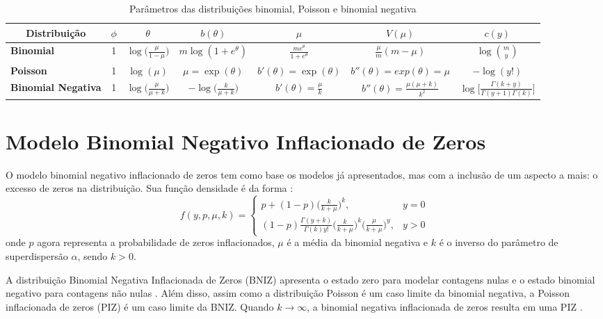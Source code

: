 \documentclass[12pt, a4paper, twoside]{report}
\numberwithin{equation}{section} %
\begin{document}
\begin{table}[h]
\centering
\footnotesize
\caption{Parâmetros das distribuições binomial, Poisson e binomial negativa}
\begin{tabular}{c|c|c|c|c|c|c} \hline
    \textbf{Distribuição} & $\phi$ & $\theta$ & $b(\theta)$ & $\mu$ & $V(\mu)$ & $c(y)$ \\ \hline
	\multicolumn{1}{l|}{\textbf{Binomial}} & 1 & $\log{ \biggl(\frac{\mu}{1-\mu} \biggl)}$ & $m \log(1+e^{\theta})$ & $\frac{me^{\theta}}{1+e^{\theta}}$ &  $\frac{\mu}{m}(m-\mu)$ & $\log{m \choose y}$ \\ \hline
	\multicolumn{1}{l|}{\textbf{Poisson}} & 1 & $\log{(\mu)}$ & $\mu=\exp(\theta)$ & $b'(\theta)=\exp(\theta)$ & $b''(\theta)=exp(\theta)=\mu$ & $-\log(y!)$ \\ \hline
    \multicolumn{1}{l|}{\textbf{Binomial Negativa}} & 1 & $\log\biggl(\frac{\mu}{\mu + k}\biggl)$ & $-\log\biggl(\frac{k}{\mu + k}\biggl)$ & $b'(\theta)=\frac{\mu}{k}$ & $b''(\theta)=\frac{\mu(\mu+k)}{k^2}$ & $\log\biggl[\frac{\Gamma(k+y)}{\Gamma(y+1)\Gamma(k)}\biggl]$ \\ \hline
\end{tabular}
\label{tab:param_mlg}
\end{table}

\section{Modelo Binomial Negativo Inflacionado de Zeros}

O modelo binomial negativo inflacionado de zeros tem como base os modelos já apresentados, mas com a inclusão de um aspecto a mais: o excesso de zeros na distribuição. Sua função densidade é da forma \citep{yau2003zero}:
\begin{equation}\label{fp_zinb}
f(y,p,\mu,k) = \begin{cases} p+(1-p) \biggl( \frac{k}{k+\mu} \biggl)^k, & y=0 \\ (1-p)\frac{\Gamma(y+k)}{\Gamma(k)y!} \biggl( \frac{k}{k+\mu} \biggl)^k \biggl( \frac{\mu}{k+\mu} \biggl)^y , & y>0 \end{cases}
\end{equation}
onde $p$ agora representa a probabilidade de zeros inflacionados, $\mu$ é a média da binomial negativa e $k$ é o inverso do parâmetro de superdispersão $\alpha$, sendo $k > 0$.

A distribuição Binomial Negativa Inflacionada de Zeros (BNIZ) apresenta o estado zero para modelar contagens nulas e o estado binomial negativo para contagens não nulas \citep{garay2011estimation}. Além disso, assim como a distribuição Poisson é um caso limite da binomial negativa, a Poisson inflacionada de zeros (PIZ) é um caso limite da BNIZ. Quando $k \xrightarrow{} \infty$, a binomial negativa inflacionada de zeros resulta em uma PIZ \citep{yau2003zero}.
\end{document}
